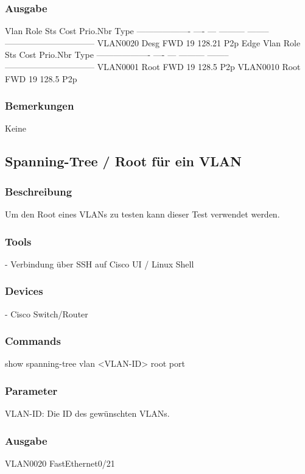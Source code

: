 \documentclass[a4,12pt]{scrartcl}
\begin{document}
\subsubsection{Ausgabe}
Vlan                Role Sts Cost      Prio.Nbr Type\newline
------------------- ---- --- --------- -------- --------------------------------\newline
VLAN0020            Desg FWD 19        128.21   P2p Edge\newline
Vlan                Role Sts Cost      Prio.Nbr Type\newline
------------------- ---- --- --------- -------- --------------------------------\newline
VLAN0001            Root FWD 19        128.5    P2p\newline
VLAN0010            Root FWD 19        128.5    P2p\newline
\subsubsection{Bemerkungen}
Keine




\subsection{Spanning-Tree / Root für ein VLAN}
\subsubsection{Beschreibung}
Um den Root eines VLANs zu testen kann dieser Test verwendet werden.
\subsubsection{Tools}
- Verbindung über SSH auf Cisco UI / Linux Shell
\subsubsection{Devices}
- Cisco Switch/Router
\subsubsection{Commands}
show spanning-tree vlan <VLAN-ID> root port
\subsubsection{Parameter}
VLAN-ID: Die ID des gewünschten VLANs.
\subsubsection{Ausgabe}
VLAN0020         FastEthernet0/21
\end{document}
